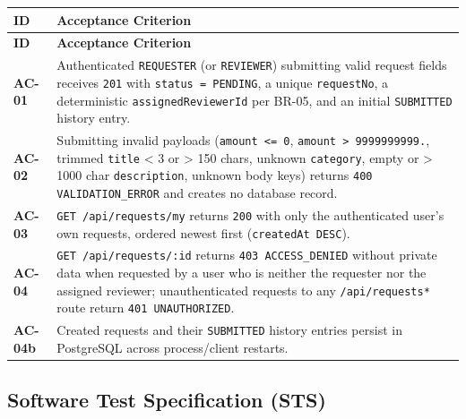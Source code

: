 \documentclass[11pt,a4paper]{article}
\begin{document}
\vspace{0.3em}
\begin{longtable}{|>{\RaggedRight}p{4.5cm}|>{\RaggedRight}p{11.3cm}|}
\hline
\rowcolor{zenPale}\textbf{ID} & \textbf{Acceptance Criterion} \\ \hline
\endfirsthead
\hline
\rowcolor{zenPale}\textbf{ID} & \textbf{Acceptance Criterion} \\ \hline
\endhead
\hline
\endfoot
\textbf{AC-01} & Authenticated \texttt{REQUESTER} (or \texttt{REVIEWER}) submitting valid request fields receives \texttt{201} with \texttt{status = PENDING}, a unique \texttt{requestNo}, a deterministic \texttt{assignedReviewerId} per BR-05, and an initial \texttt{SUBMITTED} history entry. \\ \hline
\textbf{AC-02} & Submitting invalid payloads (\texttt{amount <= 0}, \texttt{amount > 9999999999.\allowbreak 99}, trimmed \texttt{title} < 3 or > 150 chars, unknown \texttt{category}, empty or > 1000 char \texttt{description}, unknown body keys) returns \texttt{400 VALIDATION\_\allowbreak ERROR} and creates no database record. \\ \hline
\textbf{AC-03} & \texttt{GET /\allowbreak api/\allowbreak requests/\allowbreak my} returns \texttt{200} with only the authenticated user's own requests, ordered newest first (\texttt{createdAt DESC}). \\ \hline
\textbf{AC-04} & \texttt{GET /\allowbreak api/\allowbreak requests/\allowbreak :\allowbreak id} returns \texttt{403 ACCESS\_\allowbreak DENIED} without private data when requested by a user who is neither the requester nor the assigned reviewer; unauthenticated requests to any \texttt{/\allowbreak api/\allowbreak requests*} route return \texttt{401 UNAUTHORIZED}. \\ \hline
\textbf{AC-04b} & Created requests and their \texttt{SUBMITTED} history entries persist in PostgreSQL across process/client restarts. \\ \hline
\end{longtable}
\vspace{0.3em}


\subsection{Software Test Specification (STS)}
\end{document}
